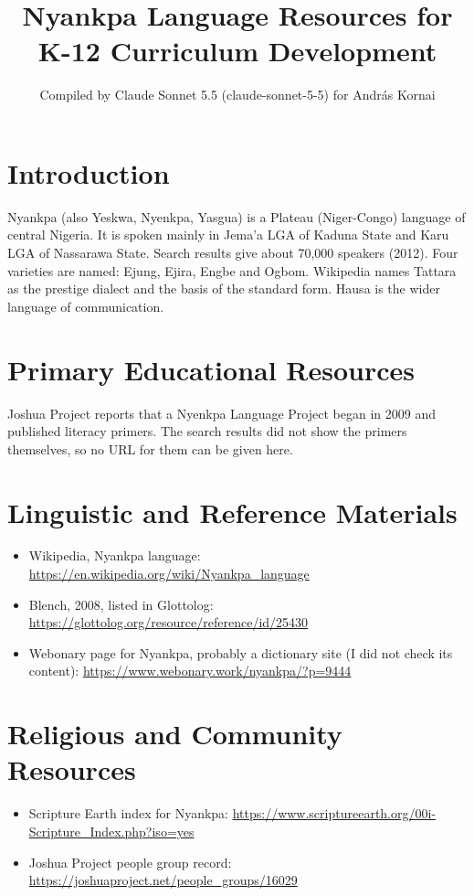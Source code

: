 \documentclass[12pt]{article}
\title{Nyankpa Language Resources for K-12 Curriculum Development}
\author{Compiled by Claude Sonnet 5.5 (claude-sonnet-5-5) for Andr\'as Kornai}
\date{}
\begin{document}
\maketitle

\section{Introduction}
Nyankpa (also Yeskwa, Nyenkpa, Yasgua) is a Plateau (Niger-Congo) language of central Nigeria. It is spoken mainly in Jema'a LGA of Kaduna State and Karu LGA of Nassarawa State. Search results give about 70,000 speakers (2012). Four varieties are named: Ejung, Ejira, Engbe and Ogbom. Wikipedia names Tattara as the prestige dialect and the basis of the standard form. Hausa is the wider language of communication.

\section{Primary Educational Resources}
Joshua Project reports that a Nyenkpa Language Project began in 2009 and published literacy primers. The search results did not show the primers themselves, so no URL for them can be given here.

\section{Linguistic and Reference Materials}
\begin{itemize}
\item Wikipedia, Nyankpa language: \url{https://en.wikipedia.org/wiki/Nyankpa_language}
\item Blench, 2008, listed in Glottolog: \url{https://glottolog.org/resource/reference/id/25430}
\item Webonary page for Nyankpa, probably a dictionary site (I did not check its content): \url{https://www.webonary.work/nyankpa/?p=9444}
\end{itemize}

\section{Religious and Community Resources}
\begin{itemize}
\item Scripture Earth index for Nyankpa: \url{https://www.scriptureearth.org/00i-Scripture_Index.php?iso=yes}
\item Joshua Project people group record: \url{https://joshuaproject.net/people_groups/16029}
\end{itemize}
\end{document}
